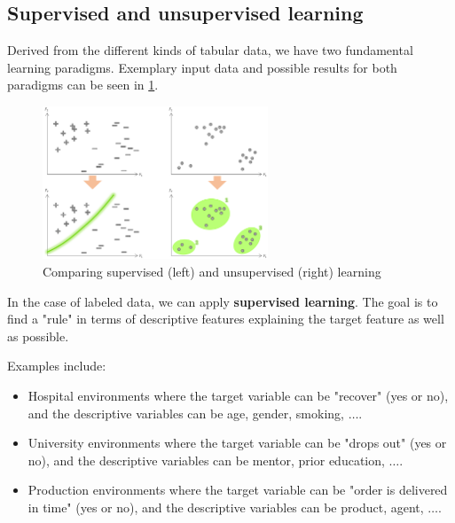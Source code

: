 \subsection{Supervised and unsupervised learning}
Derived from the different kinds of tabular data, we have two fundamental learning paradigms. Exemplary input data and possible results for both paradigms can be seen in \ref{fig:1_sv_vs_usv}.

\begin{figure}[h]
  \centering
  \includegraphics[width=0.6\textwidth]{assets/basics/SV_vs_US.png}
  \caption{Comparing supervised (left) and unsupervised (right) learning}
  \label{fig:1_sv_vs_usv}
\end{figure}

In the case of labeled data, we can apply \textbf{supervised learning}. The goal is to find a "rule" in terms of descriptive features explaining the target feature as well as possible. \begin{note}Examples include:
\begin{itemize}
  \item Hospital environments where the target variable can be "recover" (yes or no), and the descriptive variables can be age, gender, smoking, $\dots$.
  \item University environments where the target variable can be "drops out" (yes or no), and the descriptive variables can be {\color{ForestGreen}mentor, prior education, $\dots$}.
  \item Production environments where the target variable can be "order is delivered in time" (yes or no), and the descriptive variables can be product, agent, $\dots$.
\end{itemize}\end{note}

